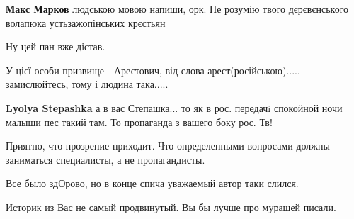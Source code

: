 \begin{itemize}
\begin{itemize}
\begin{itemize}
\textbf{Макс Марков} людською мовою напиши, орк. Не розумію твого дєрєвєнського волапюка устьзажопінських крєстьян
\end{itemize}

\end{itemize}

 
Ну цей пан вже дістав.

 
У цієї особи призвище - Арестович, від слова арест(російською)..... замислюйтесь, тому і людина така.....

\begin{itemize}
 
\textbf{Lyolya Stepashka} а в вас Степашка... то як в рос. передачi спокойной ночи малыши пес такий там. То пропаганда з вашего боку рос. Тв!
\end{itemize}

 

Приятно, что прозрение приходит. Что определенными вопросами должны заниматься
специалисты, а не пропагандисты.

Все было здОрово, но в конце спича уважаемый автор таки слился.

Историк из Вас не самый продвинутый. Вы бы лучше про мурашей писали.


 


\end{itemize}
